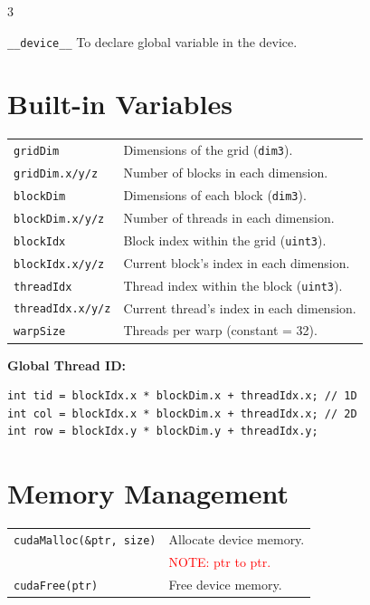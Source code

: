 \begin{multicols*}{3}
\begin{mdframed}[nobreak=true,backgroundcolor=magenta!10,linecolor=magenta]
\texttt{\_\_device\_\_} To declare global variable in the device.
\end{mdframed}

\section*{Built-in Variables}

\begin{tabularx}{\linewidth}{lX}
\texttt{gridDim}      & Dimensions of the grid (\texttt{dim3}). \\
\texttt{gridDim.x/y/z}  & Number of blocks in each dimension. \\
\texttt{blockDim}     & Dimensions of each block (\texttt{dim3}). \\
\texttt{blockDim.x/y/z} & Number of threads in each dimension. \\
\texttt{blockIdx}     & Block index within the grid (\texttt{uint3}). \\
\texttt{blockIdx.x/y/z} & Current block's index in each dimension. \\
\texttt{threadIdx}    & Thread index within the block (\texttt{uint3}). \\
\texttt{threadIdx.x/y/z} & Current thread's index in each dimension. \\
\texttt{warpSize}     & Threads per warp (constant = 32). \\
\end{tabularx}

\textbf{Global Thread ID:}
\begin{mdframed}[nobreak=true,backgroundcolor=gray!10,linecolor=Firebrick4]
\begin{verbatim}
int tid = blockIdx.x * blockDim.x + threadIdx.x; // 1D
int col = blockIdx.x * blockDim.x + threadIdx.x; // 2D
int row = blockIdx.y * blockDim.y + threadIdx.y;
\end{verbatim}
\end{mdframed}


\section*{Memory Management}

\begin{tabularx}{\linewidth}{lX}
\hline
\texttt{cudaMalloc(\&ptr, size)} & Allocate device memory. \\
                                 & \textcolor{red}{NOTE: ptr to ptr.}\\
\texttt{cudaFree(ptr)} & Free device memory. \\
\hline
\end{tabularx}


\end{multicols*}

